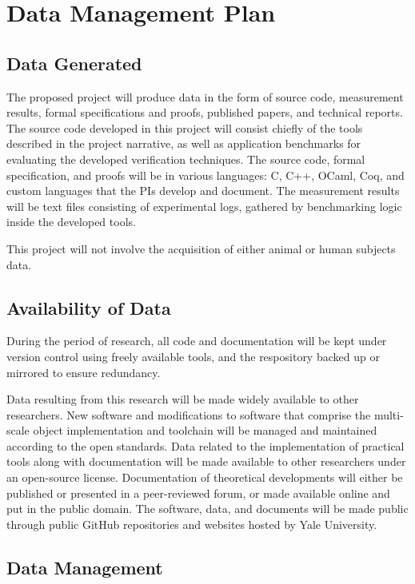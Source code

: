 \documentclass[11pt]{article}
\begin{document}
\appendix

\section*{Data Management Plan}

\subsection*{Data Generated}

The proposed project will produce data in the form of source code,
measurement results, formal specifications and proofs, published
papers, and technical reports. The source code developed in this
project will consist chiefly of the tools described in the project
narrative, as well as application benchmarks for evaluating the
developed verification techniques.  The source code, formal
specification, and proofs will be in various languages: C, C++, OCaml,
Coq, and custom languages that the PIs develop and document. The
measurement results will be text files consisting of experimental
logs, gathered by benchmarking logic inside the developed tools.

This project will not involve the acquisition of either animal or
human subjects data.

\subsection*{Availability of Data}

During the period of research, all code and documentation will be kept
under version control using freely available tools, and the
respository backed up or mirrored to ensure redundancy. 

Data resulting from this research will be made widely available to
other researchers. New software and modifications to software that
comprise the multi-scale object implementation and toolchain will be
managed and maintained according to the open standards. Data related
to the implementation of practical tools along with documentation will
be made available to other researchers under an open-source
license.  
Documentation of theoretical developments will either be
published or presented in a peer-reviewed forum, or made available
online and put in the public domain.
The software, data, and documents will be made public through public
GitHub repositories and websites hosted by Yale University.

\subsection*{Data Management}
\end{document}
